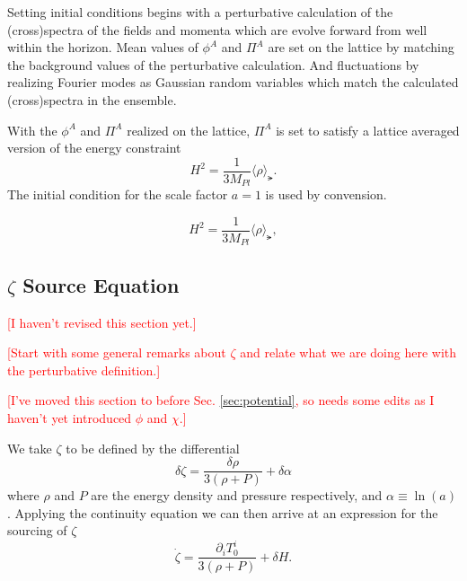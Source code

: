 Setting initial conditions begins with a perturbative calculation of the (cross)spectra of the fields and momenta which are evolve forward from well within the horizon.
Mean values of $\phi^A$ and $\Pi^A$ are set on the lattice by matching the background values of the perturbative calculation.
And fluctuations by realizing Fourier modes as Gaussian random variables which match the calculated (cross)spectra in the ensemble.

With the $\phi^A$ and $\Pi^A$ realized on the lattice, $\Pi^A$ is set to satisfy a lattice averaged version of the energy constraint
\begin{equation} \label{eq:energy constraint}
  H^2 = \frac{1}{3M_{Pl}}\langle \rho \rangle_\lat.
\end{equation}
The initial condition for the scale factor $a=1$ is used by convension.
  
\begin{equation} \label{eq:energy constraint}
  H^2 = \frac{1}{3M_{Pl}}\langle \rho \rangle_\lat,
\end{equation}

\subsection{$\zeta$ Source Equation}
\textcolor{red}{[I haven't revised this section yet.]}

\textcolor{red}{[Start with some general remarks about $\zeta$ and relate what we are doing here with the perturbative definition.]}

\textcolor{red}{[I've moved this section to before Sec. \ref{sec:potential}, so needs some edits as I haven't yet introduced $\phi$ and $\chi$.]}

We take $\zeta$ to be defined by the differential
\begin{equation} \label{eq:zeta differential}
  \delta\zeta = \frac{\delta\rho}{3(\rho + P)} + \delta\alpha
\end{equation} 
where $\rho$ and $P$ are the energy density and pressure respectively, and $\alpha \equiv \ln(a)$.
Applying the continuity equation we can then arrive at an expression for the sourcing of $\zeta$
\begin{equation} \label{eq:zeta source T}
  \dot{\zeta} = \frac{\partial_iT^i_0}{3(\rho+P)} + \delta H. %
\end{equation}

